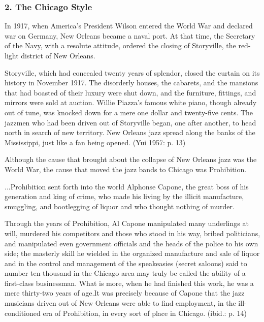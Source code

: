 \subsubsection{2. The Chicago Style}

In 1917, when America's President Wilson entered the World War and declared war on Germany, New Orleans became a naval port. At that time, the Secretary of the Navy, with a resolute attitude, ordered the closing of Storyville, the red-light district of New Orleans.

\begin{gquote}
Storyville, which had concealed twenty years of splendor, closed the curtain on its history in November 1917. The disorderly houses, the cabarets, and the mansions that had boasted of their luxury were shut down, and the furniture, fittings, and mirrors were sold at auction. Willie Piazza's famous white piano, though already out of tune, was knocked down for a mere one dollar and twenty-five cents. The jazzmen who had been driven out of Storyville began, one after another, to head north in search of new territory. New Orleans jazz spread along the banks of the Mississippi, just like a fan being opened. (Yui 1957: p. 13)
\end{gquote}

Although the cause that brought about the collapse of New Orleans jazz was the World War, the cause that moved the jazz bands to Chicago was Prohibition.

\begin{gquote}
...Prohibition sent forth into the world Alphonse Capone, the great boss of his generation and king of crime, who made his living by the illicit manufacture, smuggling, and bootlegging of liquor and who thought nothing of murder.
\end{gquote}

\begin{gquote}
Through the years of Prohibition, Al Capone manipulated many underlings at will, murdered his competitors and those who stood in his way, bribed politicians, and manipulated even government officials and the heads of the police to his own side; the masterly skill he wielded in the organized manufacture and sale of liquor and in the control and management of the speakeasies (secret saloons) said to number ten thousand in the Chicago area may truly be called the ability of a first-class businessman. What is more, when he had finished this work, he was a mere thirty-two years of age.It was precisely because of Capone that the jazz musicians driven out of New Orleans were able to find employment, in the ill-conditioned era of Prohibition, in every sort of place in Chicago. (ibid.: p. 14)
\end{gquote}


